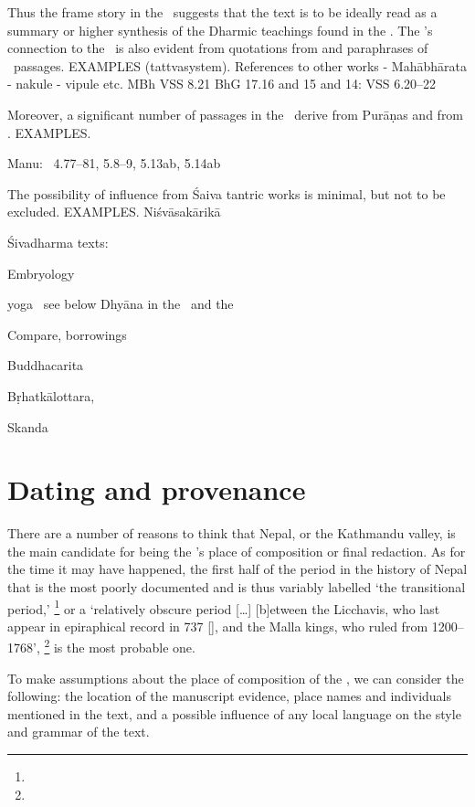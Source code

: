 \noindent
Thus the frame story in the \VSS\ suggests
that the text is to be ideally read as a summary 
or higher synthesis of the Dharmic teachings found
in the \MBH. The \VSS's connection to the \MBH\
is also evident from quotations from and paraphrases
of \MBH\ passages. EXAMPLES (tattvasystem).
  References to other works - Mahābhārata - nakule - vipule etc.
MBh VSS 8.21
BhG 17.16 and 15 and 14: VSS 6.20--22
	
Moreover, a significant number of passages in 
the \VSS\ derive from Purāṇas and from \Manu. EXAMPLES.

Manu: \VSS\ 4.77--81, 5.8--9, 5.13ab, 5.14ab

The possibility of influence from Śaiva tantric works is
minimal, but not to be excluded. EXAMPLES.
Niśvāsakārikā



Śivadharma texts:
\label{vss_connection_other_sd_texts}


Embryology

yoga \DharmP\ see below
Dhyāna in the \VSS\ and the \DHARMP
\label{dharmaputrika}

Compare, borrowings

Buddhacarita 

Bṛhatkālottara,

Skanda







\section{Dating and provenance}
\label{provenance}
There are a number of reasons to think that
Nepal, or the Kathmandu valley, is the main
candidate for being the \VSS's place of composition
or final redaction. As for the time it may have 
happened, the first half of the period in the history of Nepal 
that is the most poorly documented and is thus 
variably labelled `the transitional period,'%
	\footnote{}
or a `relatively obscure period [\dots]
[b]etween the Licchavis, who last appear 
in epiraphical record in 737 [\CE], 
and the Malla kings, who ruled from 1200--1768',%
	\footnote{}
is the most probable one.

To make assumptions about the place of 
composition of the \VSS, we can consider 
the following: the location of the manuscript 
evidence, place names and individuals  
mentioned in the text, and a possible influence
of any local language on the style and grammar
of the text.

